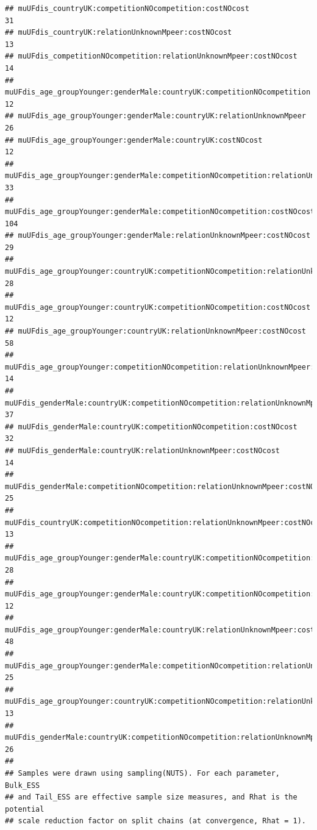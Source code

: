 \documentclass[
]{article}
\begin{document}
\begin{verbatim}
## muUFdis_countryUK:competitionNOcompetition:costNOcost                                              31
## muUFdis_countryUK:relationUnknownMpeer:costNOcost                                                  13
## muUFdis_competitionNOcompetition:relationUnknownMpeer:costNOcost                                   14
## muUFdis_age_groupYounger:genderMale:countryUK:competitionNOcompetition                             12
## muUFdis_age_groupYounger:genderMale:countryUK:relationUnknownMpeer                                 26
## muUFdis_age_groupYounger:genderMale:countryUK:costNOcost                                           12
## muUFdis_age_groupYounger:genderMale:competitionNOcompetition:relationUnknownMpeer                  33
## muUFdis_age_groupYounger:genderMale:competitionNOcompetition:costNOcost                           104
## muUFdis_age_groupYounger:genderMale:relationUnknownMpeer:costNOcost                                29
## muUFdis_age_groupYounger:countryUK:competitionNOcompetition:relationUnknownMpeer                   28
## muUFdis_age_groupYounger:countryUK:competitionNOcompetition:costNOcost                             12
## muUFdis_age_groupYounger:countryUK:relationUnknownMpeer:costNOcost                                 58
## muUFdis_age_groupYounger:competitionNOcompetition:relationUnknownMpeer:costNOcost                  14
## muUFdis_genderMale:countryUK:competitionNOcompetition:relationUnknownMpeer                         37
## muUFdis_genderMale:countryUK:competitionNOcompetition:costNOcost                                   32
## muUFdis_genderMale:countryUK:relationUnknownMpeer:costNOcost                                       14
## muUFdis_genderMale:competitionNOcompetition:relationUnknownMpeer:costNOcost                        25
## muUFdis_countryUK:competitionNOcompetition:relationUnknownMpeer:costNOcost                         13
## muUFdis_age_groupYounger:genderMale:countryUK:competitionNOcompetition:relationUnknownMpeer        28
## muUFdis_age_groupYounger:genderMale:countryUK:competitionNOcompetition:costNOcost                  12
## muUFdis_age_groupYounger:genderMale:countryUK:relationUnknownMpeer:costNOcost                      48
## muUFdis_age_groupYounger:genderMale:competitionNOcompetition:relationUnknownMpeer:costNOcost       25
## muUFdis_age_groupYounger:countryUK:competitionNOcompetition:relationUnknownMpeer:costNOcost        13
## muUFdis_genderMale:countryUK:competitionNOcompetition:relationUnknownMpeer:costNOcost              26
## 
## Samples were drawn using sampling(NUTS). For each parameter, Bulk_ESS
## and Tail_ESS are effective sample size measures, and Rhat is the potential
## scale reduction factor on split chains (at convergence, Rhat = 1).
\end{verbatim}
\end{document}
